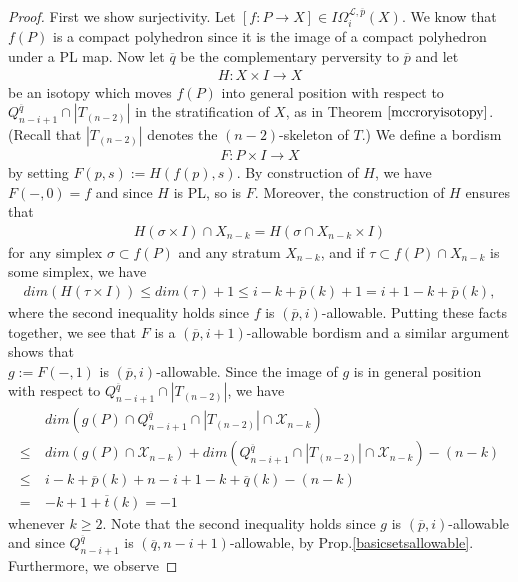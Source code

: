 \documentclass{scrreprt}
\begin{document}
\begin{proof}
First we show surjectivity. Let $[f: P \to X] \in I\Omega_i^{\mathcal{L}, \overline{p}}(X)$. We know that $f(P)$ is a compact polyhedron since it is the image of a compact polyhedron under a PL map. Now let $\overline{q}$ be the complementary perversity to $\overline{p}$ and let
\begin{align*}
H: X \times I \to X
\end{align*}
be an isotopy which moves $f(P)$ into general position with respect to $Q_{n-i+1}^{\overline{q}} \cap |T_{(n-2)}|$ in the stratification of $X$, as in Theorem $\ref{mccroryisotopy}$. (Recall that $|T_{(n-2)}|$ denotes the $(n-2)$-skeleton of $T$.) We define a bordism 
\begin{align*}
F: P \times I \to X
\end{align*}
by setting $F(p,s):= H(f(p),s)$. By construction of $H$, we have $F(-,0)=f$ and since $H$ is PL, so is $F$. Moreover, the construction of $H$ ensures that 
\begin{align*}
H(\sigma \times I) \cap X_{n-k} = H(\sigma \cap X_{n-k} \times I)
\end{align*}
for any simplex $\sigma \subset f(P)$ and any stratum $X_{n-k}$, and if $\tau \subset f(P) \cap X_{n-k}$ is some simplex, we have 
\begin{align*}
dim(H(\tau \times I)) \leq dim(\tau) +1 \leq i-k+ \overline{p}(k)+1=i+1-k + \overline{p}(k),
\end{align*}
where the second inequality holds since $f$ is $(\overline{p},i)$-allowable. Putting these facts together, we see that $F$ is a $(\overline{p},i+1)$-allowable bordism and a similar argument shows that \\ $g:=F(-,1)$ is $(\overline{p},i)$-allowable. Since the image of $g$ is in general position with respect to $Q_{n-i+1}^{\overline{q}} \cap |T_{(n-2)}|$, we have
\begin{align*}
&dim(g(P) \cap Q_{n-i+1}^{\overline{q}} \cap |T_{(n-2)}| \cap \mathcal{X}_{n-k}) \\ \leq \ &dim(g(P) \cap \mathcal{X}_{n-k}) + dim(Q_{n-i+1}^{\overline{q}} \cap |T_{(n-2)}| \cap \mathcal{X}_{n-k}) - (n-k) \\ \leq \ &i-k+ \overline{p}(k)+n-i+1-k+ \overline{q}(k)-(n-k) \\ =\  &-k+1+ \overline{t}(k) =-1
\end{align*}
whenever $k \geq 2$. Note that the second inequality holds since $g$ is $(\overline{p},i)$-allowable and since $Q_{n-i+1}^{\overline{q}}$ is $(\overline{q},n-i+1)$-allowable, by Prop.\ref{basicsetsallowable}. Furthermore, we observe

\end{proof}
\end{document}
